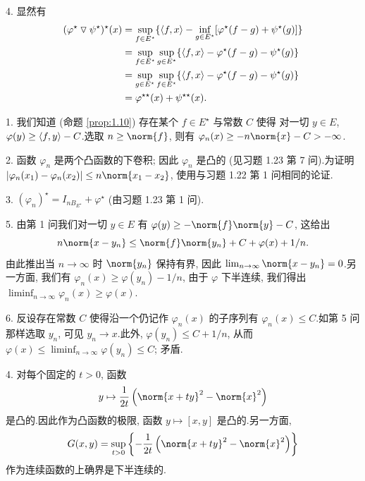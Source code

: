 4. 显然有
\begin{align*}
(\varphi^\star\mathbin{\triangledown}\psi^\star)^\star(x)
&=\sup_{f\in E^\star}\{\left\langle f,x\right\rangle-\inf_{g\in E^\star}[\varphi^\star(f-g)+\psi^\star(g)]\}\\
&=\sup_{f\in E^\star}\sup_{g\in E^\star}\{\left\langle f,x\right\rangle-\varphi^\star(f-g)-\psi^\star(g)\}\\
&=\sup_{g\in E^\star}\sup_{f\in E^\star}\{\left\langle f,x\right\rangle-\varphi^\star(f-g)-\psi^\star(g)\}\\
&=\varphi^{\star\star}(x)+\psi^{\star\star}(x).
\end{align*}


1. 我们知道 (命题  \ref{prop:1.10}) 存在某个 $f\in E^\star$ 与常数 $C$ 使得
对一切 $y\in E$, $\varphi(y)\ge\left\langle f,y\right\rangle-C$.选取 $n\ge\norm{f}$, 则有
$\varphi_n(x)\ge-n\norm{x}-C>-\infty$.

2. 函数 $\varphi_n$ 是两个凸函数的下卷积; 因此 $\varphi_n$ 是凸的 (见习题
1.23 第 7 问).为证明 $\abs{\varphi_n(x_1)-\varphi_n(x_2)}\le n\norm{x_1-x_2}$,
使用与习题 1.22 第 1 问相同的论证.

3. $(\varphi_n)^\star=I_{nB_{E^\star}}+\varphi^\star$ (由习题 1.23 第 1 问).

5. 由第 1 问我们对一切 $y\in E$ 有 $\varphi(y)\ge-\norm{f}\norm{y}-C$, 这给出
\begin{equation*}
n\norm{x-y_n}\le\norm{f}\norm{y_n}+C+\varphi(x)+1/n.
\end{equation*}
由此推出当 $n\to\infty$ 时 $\norm{y_n}$ 保持有界, 因此
$\lim_{n\to\infty}\norm{x-y_n}=0$.另一方面, 我们有
$\varphi_n(x)\ge\varphi(y_n)-1/n$, 由于 $\varphi$ 下半连续, 我们得出
$\liminf_{n\to\infty}\varphi_n(x)\ge\varphi(x)$.

6. 反设存在常数 $C$ 使得沿一个仍记作 $\varphi_n(x)$ 的子序列有
$\varphi_n(x)\le C$.如第 5 问那样选取 $y_n$, 可见 $y_n\to x$.此外,
$\varphi(y_n)\le C+1/n$, 从而
$\varphi(x)\le\liminf_{n\to\infty}\varphi(y_n)\le C$; 矛盾.


4. 对每个固定的 $t>0$, 函数
\begin{equation*}
y\mapsto\frac{1}{2t}\left(\norm{x+ty}^2-\norm{x}^2\right)
\end{equation*}
是凸的.因此作为凸函数的极限, 函数 $y\mapsto[x,y]$ 是凸的.另一方面,
\begin{equation*}
G(x,y)=\sup_{t>0}\left\{-\frac{1}{2t}\left(\norm{x+ty}^2-\norm{x}^2\right)\right\}
\end{equation*}
作为连续函数的上确界是下半连续的.

